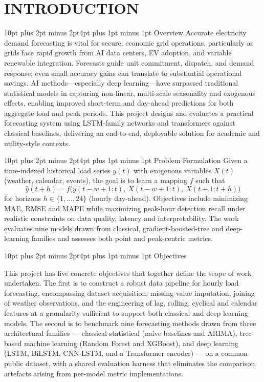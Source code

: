 \documentclass[12pt,a4paper,openany]{report}
\makeatletter
\renewcommand{\section}{\@startsection{section}{1}{\z@}%
  {10pt plus 2pt minus 2pt}{4pt plus 1pt minus 1pt}%
  {\normalfont\normalsize\bfseries}}
\makeatother
\begin{document}
\clearpage
{}
\chapter{INTRODUCTION}
\section{Overview}
Accurate electricity demand forecasting is vital for secure, economic grid operations, particularly as grids face rapid growth from AI data centers, EV adoption, and variable renewable integration. Forecasts guide unit commitment, dispatch, and demand response; even small accuracy gains can translate to substantial operational savings. AI methods---especially deep learning---have surpassed traditional statistical models in capturing non-linear, multi-scale seasonality and exogenous effects, enabling improved short-term and day-ahead predictions for both aggregate load and peak periods. This project designs and evaluates a practical forecasting system using LSTM-family networks and transformers against classical baselines, delivering an end-to-end, deployable solution for academic and utility-style contexts.


\section{Problem Formulation}
Given a time-indexed historical load series $y(t)$ with exogenous variables $X(t)$ (weather, calendar, events), the goal is to learn a mapping $f$ such that
\begin{equation}
\hat y(t+h) = f\bigl(y(t-w+1{:}t),\ X(t-w+1{:}t),\ X(t+1{:}t+h)\bigr)
\end{equation}
for horizons $h \in \{1,\dots,24\}$ (hourly day-ahead). Objectives include minimizing MAE, RMSE and MAPE while maximizing peak-hour detection recall under realistic constraints on data quality, latency and interpretability. The work evaluates nine models drawn from classical, gradient-boosted-tree and deep-learning families and assesses both point and peak-centric metrics.

\section{Objectives}

This project has five concrete objectives that together define the scope of work undertaken. The first is to construct a robust data pipeline for hourly load forecasting, encompassing dataset acquisition, missing-value imputation, joining of weather observations, and the engineering of lag, rolling, cyclical and calendar features at a granularity sufficient to support both classical and deep learning models. The second is to benchmark nine forecasting methods drawn from three architectural families --- classical statistical (naive baselines and ARIMA), tree-based machine learning (Random Forest and XGBoost), and deep learning (LSTM, BiLSTM, CNN-LSTM, and a Transformer encoder) --- on a common public dataset, with a shared evaluation harness that eliminates the comparison artefacts arising from per-model metric implementations.
\end{document}
